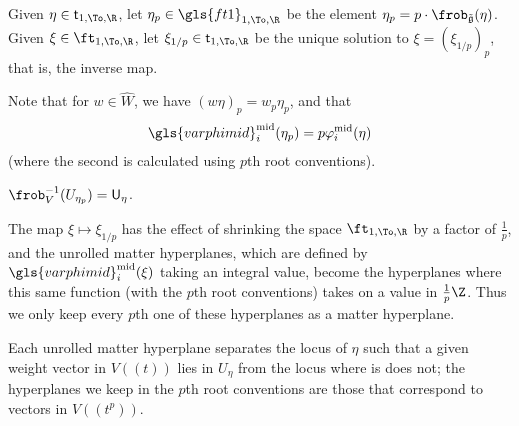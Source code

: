 \begin{definition}
  Given $\eta\in \mathsf{t}_{1,\To,\R} $, let $\eta_p\in\gls{ft1}_{1,\To,\R}$ be the
  element  $\eta_p=p\cdot \frob_{\mathfrak{\tilde{g}}}(\eta)$.  Given
  $\xi\in \ft_{1,\To,\R}$, let  $\xi_{1/p}\in \mathsf{t}_{1,\To,\R}$ be the unique solution to $\xi=(\xi_{1/p})_p$, that is, the inverse map.
\end{definition}
Note that for $w\in \widehat{W}$, we have $(w\eta)_p=w_p\eta_p$, and that
\begin{equation}
\gls{varphimid}^{\operatorname{mid}}_i(\eta_p)=p\mathsf{\varphi}^{\operatorname{mid}}_i(\eta)\label{eq:p-mid}
\end{equation}
(where the second is calculated using $p$th root conventions).
\begin{lemma}
  $\frob_V^{-1}(U_{\eta_p})=\mathsf{U}_{\eta}$.
\end{lemma}
\begin{remark}
  The map $\xi\mapsto \xi_{1/p}$ has the effect of shrinking the space
  $\ft_{1,\To,\R}$ by a factor of $\frac{1}{p}$, and the unrolled matter
  hyperplanes, which are defined by  $\gls{varphimid}_i^{\operatorname{mid}}(\xi)$ taking an
  integral value, become the hyperplanes where this same function
  (with the $p$th root conventions)  takes on a value in
  $\frac{1}{p}\Z$.  Thus we only keep every $p$th one of these
  hyperplanes as a matter hyperplane.

  Each unrolled matter hyperplane separates the locus of $\eta$ such
  that a given weight vector in $V((t))$ lies in $U_\eta$ from the
  locus where is does not; the hyperplanes we keep in the $p$th root
  conventions are those that correspond to vectors in $V((t^p))$.
\end{remark}

